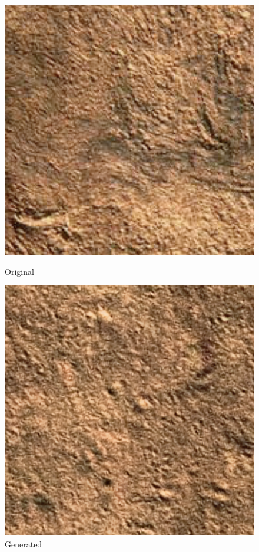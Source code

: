 \documentclass{article}
\begin{document}
    \begin{figure}[!htb]
    \begin{center}
      \includegraphics[scale=.32]{5/report/steerable/3.png}
      \caption{Original}
    \end{center}
    \endminipage \hfill
    \begin{center}
      \includegraphics[scale=.32]{5/report/steerable/3_c.png}
      \caption{Generated}
    \end{center}
    \endminipage
    \end{figure} 
\pagebreak\\
\end{document}
